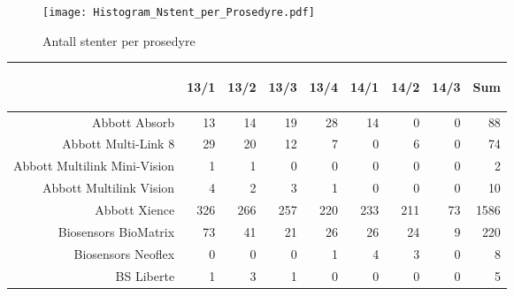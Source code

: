 \documentclass[presentation,xcolor=pdftex,dvipsnames,table]{beamer}
\begin{document}
\begin{frame}
\begin{figure}
  \centering
  \caption{Antall stenter per prosedyre}
  

\texttt{[image: Histogram\_Nstent\_per\_Prosedyre.pdf]}
\end{figure}
\end{frame}




\begin{frame}
\begin{tiny}
\begin{table}[ht]
\centering
\begin{tabular}{rrrrrrrrr}
  \toprule
 & \begin{sideways} 13/1 \end{sideways} & \begin{sideways} 13/2 \end{sideways} & \begin{sideways} 13/3 \end{sideways} & \begin{sideways} 13/4 \end{sideways} & \begin{sideways} 14/1 \end{sideways} & \begin{sideways} 14/2 \end{sideways} & \begin{sideways} 14/3 \end{sideways} & \begin{sideways} Sum \end{sideways} \\ 
  \midrule
Abbott Absorb & 13 & 14 & 19 & 28 & 14 & 0 & 0 & 88 \\ 
  Abbott Multi-Link 8 & 29 & 20 & 12 & 7 & 0 & 6 & 0 & 74 \\ 
  Abbott Multilink Mini-Vision & 1 & 1 & 0 & 0 & 0 & 0 & 0 & 2 \\ 
  Abbott Multilink Vision & 4 & 2 & 3 & 1 & 0 & 0 & 0 & 10 \\ 
  Abbott Xience & 326 & 266 & 257 & 220 & 233 & 211 & 73 & 1586 \\ 
  Biosensors BioMatrix & 73 & 41 & 21 & 26 & 26 & 24 & 9 & 220 \\ 
  Biosensors Neoflex & 0 & 0 & 0 & 1 & 4 & 3 & 0 & 8 \\ 
  BS Liberte & 1 & 3 & 1 & 0 & 0 & 0 & 0 & 5 \\ 

\end{tabular}
\end{table}
\end{tiny}
\end{frame}
\end{document}
